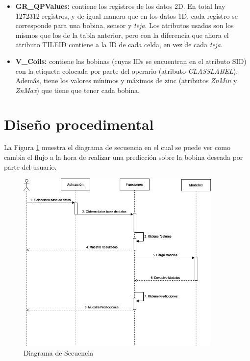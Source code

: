 \begin{itemize}
\begin{itemize}
        \end{itemize}
    \item \textbf{GR\_QPValues:} contiene los registros de los datos 2D. En total hay 1272312 registros, y de igual manera que en los datos 1D, cada registro se corresponde para una bobina, sensor y \emph{teja}. Los atributos usados son los mismos que los de la tabla anterior, pero con la diferencia que ahora el atributo TILEID contiene a la ID de cada celda, en vez de cada \emph{teja}.
    \item \textbf{V\_Coils:} contiene las bobinas (cuyas IDs se encuentran en el atributo SID) con la etiqueta colocada por parte del operario (atributo \emph{CLASSLABEL}). Además, tiene los valores mínimos y máximos de zinc (atributos \emph{ZnMin} y \emph{ZnMax}) que tiene que tener cada bobina.
\end{itemize}

\section{Diseño procedimental}
La Figura \ref{f:secu} muestra el diagrama de secuencia en el cual se puede ver como cambia el flujo a la hora de realizar una predicción sobre la bobina deseada por parte del usuario.

\begin{figure}[h]
 \centering
  \includegraphics[width=0.9\textwidth]{img/secu.png}
 \caption{Diagrama de Secuencia}
 \label{f:secu}
\end{figure}

